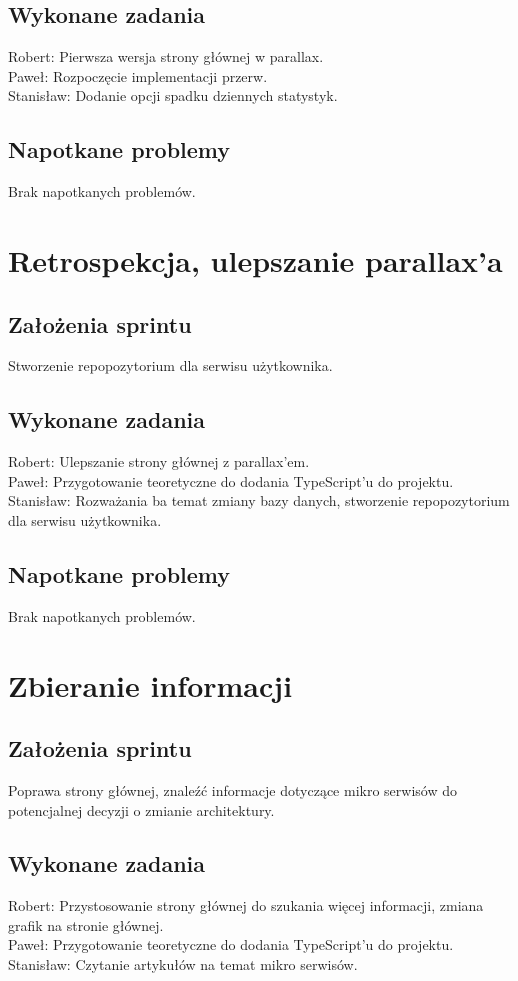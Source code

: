 \documentclass[a4paper,11pt]{report}
\begin{document}
\subsection {Wykonane zadania}
Robert: Pierwsza wersja strony głównej w parallax.\\
Paweł: Rozpoczęcie implementacji przerw.\\
Stanisław: Dodanie opcji spadku dziennych statystyk.\\
\subsection {Napotkane problemy}
Brak napotkanych problemów.

\section {Retrospekcja, ulepszanie parallax'a}
\subsection {Założenia sprintu}
Stworzenie repopozytorium dla serwisu użytkownika.
\subsection {Wykonane zadania}
Robert: Ulepszanie strony głównej z parallax'em.\\
Paweł: Przygotowanie teoretyczne do dodania TypeScript'u do projektu.\\
Stanisław: Rozważania ba temat zmiany bazy danych, stworzenie repopozytorium dla serwisu użytkownika.\\
\subsection {Napotkane problemy}
Brak napotkanych problemów.

\section {Zbieranie informacji}
\subsection {Założenia sprintu}
Poprawa strony głównej, znaleźć informacje dotyczące mikro serwisów do potencjalnej decyzji o zmianie architektury.
\subsection {Wykonane zadania}
Robert: Przystosowanie strony głównej do szukania więcej informacji, zmiana grafik na stronie głównej.\\ 
Paweł: Przygotowanie teoretyczne do dodania TypeScript'u do projektu. \\
Stanisław: Czytanie artykułów na temat mikro serwisów.\\
\end{document}
